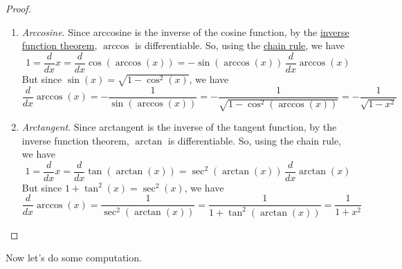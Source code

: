 \begin{proof}
\begin{enumerate}
      \item \textit{Arccosine}. Since arccosine is the inverse of the cosine function, by the \hyperref[thm:inverse-ft]{inverse function theorem}, $\arccos$ is differentiable. So, using the \hyperref[thm:chain]{chain rule}, we have 
        \begin{equation}
          1 = \frac{d}{dx} x = \frac{d}{dx} \cos(\arccos(x)) = -\sin(\arccos(x)) \, \frac{d}{dx} \arccos(x) 
        \end{equation}
        But since $\sin(x) = \sqrt{1 - \cos^2 (x)}$, we have 
        \begin{equation}
          \frac{d}{dx} \arccos(x) = - \frac{1}{\sin(\arccos(x))} = - \frac{1}{\sqrt{1 - \cos^2(\arccos(x))}} = -\frac{1}{\sqrt{1 - x^2}}
        \end{equation}

      \item \textit{Arctangent}. Since arctangent is the inverse of the tangent function, by the inverse function theorem, $\arctan$ is differentiable. So, using the chain rule, we have 
        \begin{equation}
          1 = \frac{d}{dx} x = \frac{d}{dx} \tan(\arctan(x)) = \sec^2 (\arctan(x)) \, \frac{d}{dx} \arctan(x) 
        \end{equation}
        But since $1 + \tan^2 (x) = \sec^2 (x)$, we have 
        \begin{equation}
          \frac{d}{dx} \arccos(x) = \frac{1}{\sec^2(\arctan(x))} = \frac{1}{1 + \tan^2 (\arctan(x))} = \frac{1}{1 + x^2}
        \end{equation}
    \end{enumerate}
  \end{proof}

  Now let's do some computation. 

